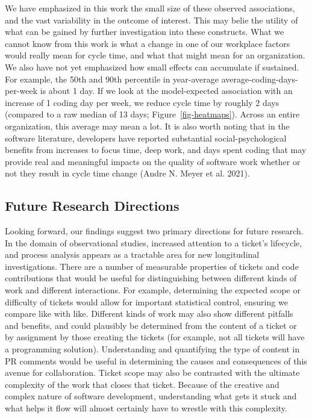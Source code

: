\documentclass[
]{article}
\begin{document}
We have emphasized in this work the small size of these observed
associations, and the vast variability in the outcome of interest. This
may belie the utility of what can be gained by further investigation
into these constructs. What we cannot know from this work is what a
change in one of our workplace factors would really mean for cycle time,
and what that might mean for an organization. We also have not yet
emphasized how small effects can accumulate if sustained. For example,
the 50th and 90th percentile in year-average
average-coding-days-per-week is about 1 day. If we look at the
model-expected association with an increase of 1 coding day per week, we
reduce cycle time by roughly 2 days (compared to a raw median of 13
days; Figure~\ref{fig-heatmaps}). Across an entire organization, this
average may mean a lot. It is also worth noting that in the software
literature, developers have reported substantial social-psychological
benefits from increases to focus time, deep work, and days spent coding
that may provide real and meaningful impacts on the quality of software
work whether or not they result in cycle time change (Andre N. Meyer et
al. 2021).

\subsection{Future Research
Directions}\label{future-research-directions}

Looking forward, our findings suggest two primary directions for future
research. In the domain of observational studies, increased attention to
a ticket's lifecycle, and process analysis appears as a tractable area
for new longitudinal investigations. There are a number of measurable
properties of tickets and code contributions that would be useful for
distinguishing between different kinds of work and different
interactions. For example, determining the expected scope or difficulty
of tickets would allow for important statistical control, ensuring we
compare like with like. Different kinds of work may also show different
pitfalls and benefits, and could plausibly be determined from the
content of a ticket or by assignment by those creating the tickets (for
example, not all tickets will have a programming solution).
Understanding and quantifying the type of content in PR comments would
be useful in determining the causes and consequences of this avenue for
collaboration. Ticket scope may also be contrasted with the ultimate
complexity of the work that closes that ticket. Because of the creative
and complex nature of software development, understanding what gets it
stuck and what helps it flow will almost certainly have to wrestle with
this complexity.
\end{document}
